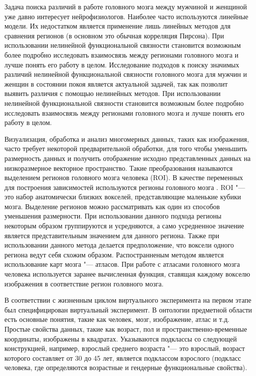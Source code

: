 Задача поиска различий в работе головного мозга между мужчиной и женщиной уже давно интересует нейрофизиологов. 
Наиболее часто используются линейные модели. 
Их недостатком является применение лишь линейных методов для сравнения регионов 
(в основном это обычная корреляция Пирсона). При использовании нелинейной функциональной связности становится 
возможным более подробно исследовать взаимосвязь между регионами головного мозга и лучше понять его работу в целом. 
Исследование подходов к поиску значимых различий нелинейной функциональной связности головного мозга для мужчин и женщин 
в состоянии покоя является актуальной задачей, так как позволит выявить различия с помощью нелинейных методов. 
При использовании нелинейной функциональной связности становится возможным более подробно исследовать 
взаимосвязь между регионами головного мозга и лучше понять его работу в целом.

Визуализация, обработка и анализ многомерных данных, таких как изображения, часто требует некоторой предварительной 
обработки, для того чтобы уменьшить размерность данных и получить отображение исходно представленных данных на 
низкоразмерное векторное пространство. 
Такие преобразования называются выделением регионов головного мозга человека (ROI). 
В качестве переменных для построения зависимостей используются регионы головного мозга . ROI "--- это набор 
анатомически близких вокселей, представляющие маленькие кубики мозга. 
Выделение регионов можно рассматривать как один из способов уменьшения размерности. 
При использовании данного подхода регионы некоторым образом группируются и усредняются, а само усредненное значение 
является представительным значением для данного региона. Также при использовании данного метода делается предположение, 
что воксели одного региона ведут себя схожим образом. 
Распостранненым методом является использование карт мозга "--- атласов. При работе с атласами головного мозга человека 
используется заранее вычисленная функция, ставящая каждому вокселю изображения в соответствие регион головного мозга.

В соответствии с жизненным циклом виртуального эксперимента на первом этапе был специфицирован виртуальный 
эксперимент. В онтологии предметной области есть основные понятия, такие как человек, мозг, изображение, атлас и т.д. 
Простые свойства данных, такие как возраст, пол и пространственно-временные координаты, изображены в квадратах. 
Указываются подклассы со следующей конструкцией, например, взрослый среднего 
возраста "--- это взрослый, возраст которого составляет от 
30 до 45 лет, является подклассом взрослого (подкласс человека, где определяются возрастные и гендерные 
функциональные свойства).


